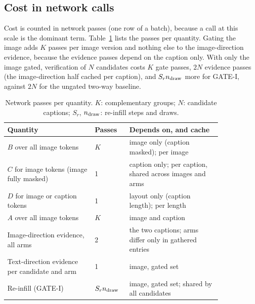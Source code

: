 \subsection{Cost in network calls}\label{app:cost}
Cost is counted in network passes (one row of a batch), because a call at this scale is the dominant term.
Table~\ref{tab:cost} lists the passes per quantity.
Gating the image adds $K$ passes per image version and nothing else to the image-direction evidence, because the evidence
passes depend on the caption only.
With only the image gated, verification of $N$ candidates costs $K$ gate passes, $2N$ evidence passes (the image-direction
half cached per caption), and $S_rn_{\rm draw}$ more for GATE-I, against $2N$ for the ungated two-way baseline.

\begin{table}[t]
\centering
\caption{Network passes per quantity. $K$: complementary groups; $N$: candidate captions; $S_r$, $n_{\rm draw}$: re-infill steps and draws.}
\label{tab:cost}
\small
\begin{tabular}{p{0.36\linewidth}p{0.12\linewidth}p{0.38\linewidth}}
\toprule
Quantity & Passes & Depends on, and cache \\
\midrule
$B$ over all image tokens & $K$ & image only (caption masked); per image \\
$C$ for image tokens (image fully masked) & 1 & caption only; per caption, shared across images and arms \\
$D$ for image or caption tokens & 1 & layout only (caption length); per length \\
$A$ over all image tokens & $K$ & image and caption \\
Image-direction evidence, all arms & 2 & the two captions; arms differ only in gathered entries \\
Text-direction evidence per candidate and arm & 1 & image, gated set \\
Re-infill (GATE-I) & $S_rn_{\rm draw}$ & image, gated set; shared by all candidates \\
\bottomrule
\end{tabular}
\end{table}

